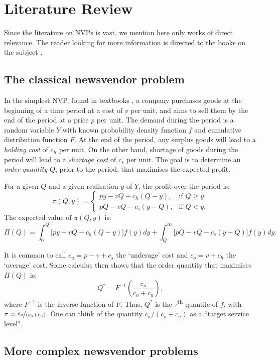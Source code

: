 \documentclass{article}
\begin{document}
\section{Literature Review} \label{se:lit}

Since the literature on NVPs is vast, we mention here only works of direct relevance. The reader looking for more information is directed to the books on the subject \cite{Ch12,Po02,SPP98,Zi00}.

\subsection{The classical newsvendor problem} %

In the simplest NVP, found in textbooks \cite{Ch12}, a company purchases goods at the beginning of a time period at a cost of $v$ per unit, and aims to sell them by the end of the period at a price $p$ per unit. The demand during the period is a random variable $Y$ with known probability density function $f$ and cumulative distribution function $F$. At the end of the period, any surplus goods will lead to a \emph{holding cost} of $c_h$ per unit. On the other hand, shortage of goods during the period will lead to a \emph{shortage cost} of $c_s$ per unit. The goal is to determine an \emph{order quantity} $Q$, prior to the period, that maximises the expected profit.

For a given $Q$ and a given realisation $y$ of $Y$, the profit over the period is:
\[
    \pi(Q,y)=
    \begin{cases}
        py-vQ-c_h(Q-y),& \text{if } Q\geq y\\
        pQ-vQ-c_s(y-Q),& \text{if } Q< y.
    \end{cases}
\]
The expected value of $\pi(Q,y)$ is:
\[
    \Pi(Q) = \int_{0}^{Q} \big[ py-vQ-c_h(Q-y) \big] f(y)dy + \int_{Q}^{\infty} \big[ pQ-vQ-c_s(y-Q) \big] f(y)dy.
\]

It is common to call $c_u= p-v+c_s$ the ‘underage’ cost and $c_o = v+c_h$ the ‘overage’ cost. Some calculus then shows that the order quantity that maximises $\Pi(Q)$ is:
\[
    Q^* = F^{-1}\left( \frac{c_u}{c_o+c_u} \right),
\]
where $F^{-1}$ is the inverse function of $F$. Thus, $Q^*$ is the $\tau$\textsuperscript{th} quantile of $f$, with $\tau=\nicefrac{c_u}{(c_o+c_u)}$. One can think of the quantity
$c_u/(c_o+c_u)$ as a ``target service level".

\subsection{More complex newsvendor problems} %
\end{document}
